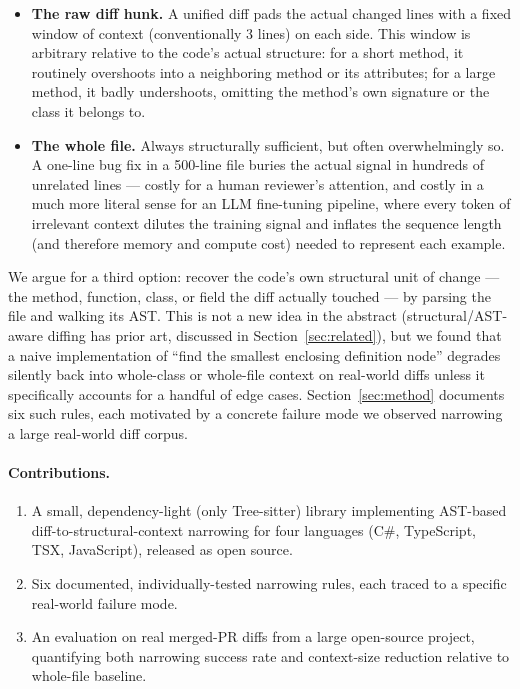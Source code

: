 \documentclass[11pt]{article}
\begin{document}
\begin{itemize}
\item \textbf{The raw diff hunk.} A unified diff pads the actual changed lines
with a fixed window of context (conventionally 3 lines) on each side. This window
is arbitrary relative to the code's actual structure: for a short method, it
routinely overshoots into a neighboring method or its attributes; for a large
method, it badly undershoots, omitting the method's own signature or the class it
belongs to.
\item \textbf{The whole file.} Always structurally sufficient, but often
overwhelmingly so. A one-line bug fix in a 500-line file buries the actual signal
in hundreds of unrelated lines --- costly for a human reviewer's attention, and
costly in a much more literal sense for an LLM fine-tuning pipeline, where every
token of irrelevant context dilutes the training signal and inflates the sequence
length (and therefore memory and compute cost) needed to represent each example.
\end{itemize}

We argue for a third option: recover the code's own structural unit of
change --- the method, function, class, or field the diff actually touched --- by
parsing the file and walking its AST. This is not a new idea in the abstract
(structural/AST-aware diffing has prior art, discussed in
Section~\ref{sec:related}), but we found that a naive implementation of ``find the
smallest enclosing definition node'' degrades silently back into whole-class or
whole-file context on real-world diffs unless it specifically accounts for a
handful of edge cases. Section~\ref{sec:method} documents six such rules, each
motivated by a concrete failure mode we observed narrowing a large real-world diff
corpus.

\paragraph{Contributions.}
\begin{enumerate}
\item A small, dependency-light (only Tree-sitter) library implementing
AST-based diff-to-structural-context narrowing for four languages (C\#,
TypeScript, TSX, JavaScript), released as open source.
\item Six documented, individually-tested narrowing rules, each traced to a
specific real-world failure mode.
\item An evaluation on real merged-PR diffs from a large open-source project,
quantifying both narrowing success rate and context-size reduction relative to
whole-file baseline.
\end{enumerate}
\end{document}
